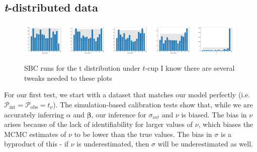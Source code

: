 \documentclass[fleqn,usenatbib]{mnras}
\begin{document}
\subsection{\textit{t}-distributed data}
\label{sec:results.t}

\begin{figure}
    \includegraphics[width=0.19\textwidth]{graphics/sbc_t/alpha_scaled.pdf}
    \includegraphics[width=0.19\textwidth]{graphics/sbc_t/beta_scaled.0.pdf}
    \includegraphics[width=0.19\textwidth]{graphics/sbc_t/beta_scaled.1.pdf}
    \includegraphics[width=0.19\textwidth]{graphics/sbc_t/sigma_scaled.pdf}
    \includegraphics[width=0.19\textwidth]{graphics/sbc_t/nu.pdf}
    \caption{SBC runs for the t distribution under $t$-cup {\color{red} I know
    there are several tweaks needed to these plots}}
    \label{fig:results.t.sbc}
\end{figure}

For our first test, we start with a dataset that matches our model perfectly
(i.e.\ $\mathcal P_{\text{int}} = \mathcal P_{\text{obs}} = t_\nu$). The
simulation-based calibration tests show that, while we are accurately inferring
$\alpha$ and $\boldsymbol{\beta}$, our inference for $\sigma_{int}$ and $\nu$ is
biased. The bias in $\nu$ arises because of the lack of identifiability for
larger values of $\nu$, which biases the MCMC estimates of $\nu$ to be lower
than the true values. The bias in $\sigma$ is a byproduct of this - if $\nu$ is
underestimated, then $\sigma$ will be underestimated as well.
\end{document}
